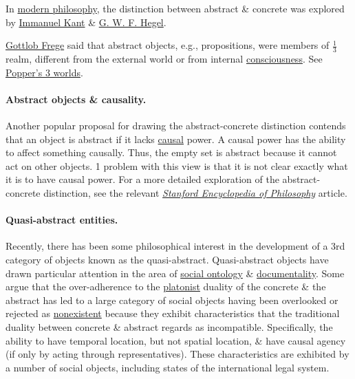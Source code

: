 \documentclass{article}
\begin{document}
In \href{https://en.wikipedia.org/wiki/Modern_philosophy}{modern philosophy}, the distinction between abstract \& concrete was explored by \href{https://en.wikipedia.org/wiki/Immanuel_Kant}{\sc Immanuel Kant} \& \href{https://en.wikipedia.org/wiki/G._W._F._Hegel}{G. W. F. Hegel}.

\href{https://en.wikipedia.org/wiki/Gottlob_Frege}{\sc Gottlob Frege} said that abstract objects, e.g., propositions, were members of $\frac{1}{3}$ realm, different from the external world or from internal \href{https://en.wikipedia.org/wiki/Consciousness}{consciousness}. See \href{https://en.wikipedia.org/wiki/Popper%27s_three_worlds}{{\sc Popper}'s 3 worlds}.

\paragraph{Abstract objects \& causality.} Another popular proposal for drawing the abstract-concrete distinction contends that an object is abstract if it lacks \href{https://en.wikipedia.org/wiki/Causality}{causal} power. A causal power has the ability to affect something causally. Thus, the empty set is abstract because it cannot act on other objects. 1 problem with this view is that it is not clear exactly what it is to have causal power. For a more detailed exploration of the abstract-concrete distinction, see the relevant \href{https://en.wikipedia.org/wiki/Stanford_Encyclopedia_of_Philosophy}{\it Stanford Encyclopedia of Philosophy} article.

\paragraph{Quasi-abstract entities.} Recently, there has been some philosophical interest in the development of a 3rd category of objects known as the quasi-abstract. Quasi-abstract objects have drawn particular attention in the area of \href{https://en.wikipedia.org/wiki/Social_ontology}{social ontology} \& \href{https://en.wikipedia.org/wiki/Documentality}{documentality}. Some argue that the over-adherence to the \href{https://en.wikipedia.org/wiki/Platonism}{platonist} duality of the concrete \& the abstract has led to a large category of social objects having been overlooked or rejected as \href{https://en.wikipedia.org/wiki/Nonexistent_object}{nonexistent} because they exhibit characteristics that the traditional duality between concrete \& abstract regards as incompatible. Specifically, the ability to have temporal location, but not spatial location, \& have causal agency (if only by acting through representatives). These characteristics are exhibited by a number of social objects, including states of the international legal system.
\end{document}
